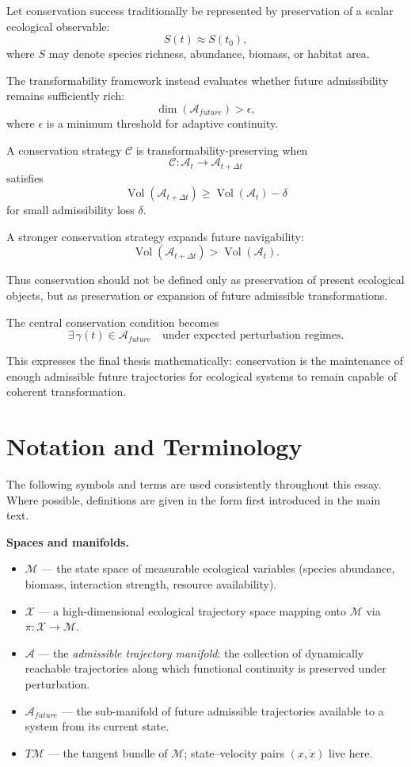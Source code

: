 \documentclass[11pt,a4paper]{article}
\newcommand{\Aspace}{\mathcal{A}}
\newcommand{\Mspace}{\mathcal{M}}
\newcommand{\Xspace}{\mathcal{X}}
\begin{document}
Let conservation success traditionally be represented by preservation of a scalar ecological observable:
\[
S(t)\approx S(t_0),
\]
where $S$ may denote species richness, abundance, biomass, or habitat area.

The transformability framework instead evaluates whether future admissibility remains sufficiently rich:
\[
\dim(\Aspace_{future})>\epsilon,
\]
where $\epsilon$ is a minimum threshold for adaptive continuity.

A conservation strategy $\mathcal{C}$ is transformability-preserving when
\[
\mathcal{C}:\Aspace_t\rightarrow \Aspace_{t+\Delta t}
\]
satisfies
\[
\operatorname{Vol}(\Aspace_{t+\Delta t})
\geq
\operatorname{Vol}(\Aspace_t)-\delta
\]
for small admissibility loss $\delta$.

A stronger conservation strategy expands future navigability:
\[
\operatorname{Vol}(\Aspace_{t+\Delta t})
>
\operatorname{Vol}(\Aspace_t).
\]

Thus conservation should not be defined only as preservation of present ecological objects, but as preservation or expansion of future admissible transformations.

The central conservation condition becomes
\[
\exists\,\gamma(t)\in \Aspace_{future}
\quad \text{under expected perturbation regimes}.
\]

This expresses the final thesis mathematically: conservation is the maintenance of enough admissible future trajectories for ecological systems to remain capable of coherent transformation.



\section{Notation and Terminology}

The following symbols and terms are used consistently throughout this essay. Where possible, definitions are given in the form first introduced in the main text.

\medskip
\noindent\textbf{Spaces and manifolds.}
\begin{itemize}
  \item $\Mspace$ --- the state space of measurable ecological variables (species abundance, biomass, interaction strength, resource availability).
  \item $\Xspace$ --- a high-dimensional ecological trajectory space mapping onto $\Mspace$ via $\pi:\Xspace\to\Mspace$.
  \item $\Aspace$ --- the \emph{admissible trajectory manifold}: the collection of dynamically reachable trajectories along which functional continuity is preserved under perturbation.
  \item $\Aspace_{future}$ --- the sub-manifold of future admissible trajectories available to a system from its current state.
  \item $T\Mspace$ --- the tangent bundle of $\Mspace$; state--velocity pairs $(x,\dot{x})$ live here.
\end{itemize}
\end{document}
